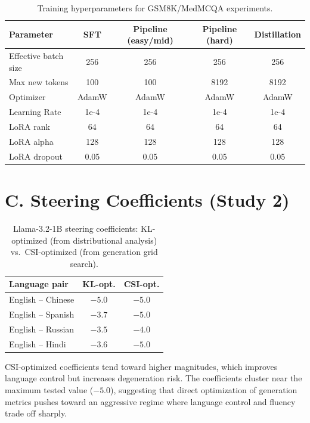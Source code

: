 \begin{table}[h]
\centering
\caption{Training hyperparameters for GSM8K/MedMCQA experiments.}
\begin{tabular}{lcccc}
\toprule
Parameter & SFT & Pipeline (easy/mid) & Pipeline (hard) & Distillation \\
\midrule
Effective batch size & 256 & 256 & 256 & 256 \\
Max new tokens & 100 & 100 & 8192 & 8192 \\
Optimizer & AdamW & AdamW & AdamW & AdamW \\
Learning Rate & 1e-4 & 1e-4 & 1e-4 & 1e-4 \\
LoRA rank & 64 & 64 & 64 & 64 \\
LoRA alpha & 128 & 128 & 128 & 128 \\
LoRA dropout & 0.05 & 0.05 & 0.05 & 0.05 \\
\bottomrule
\end{tabular}
\label{tab:hyperparams_gsm8k}
\end{table}

\section*{C. Steering Coefficients (Study 2)}

\begin{table}[h]
\centering
\caption{Llama-3.2-1B steering coefficients: KL-optimized (from distributional analysis) vs.\ CSI-optimized (from generation grid search).}
\begin{tabular}{lcc}
\toprule
Language pair & KL-opt. & CSI-opt. \\
\midrule
English -- Chinese  & $-5.0$ & $-5.0$ \\
English -- Spanish  & $-3.7$ & $-5.0$ \\
English -- Russian  & $-3.5$ & $-4.0$ \\
English -- Hindi    & $-3.6$ & $-5.0$ \\
\bottomrule
\end{tabular}
\label{tab:appendix_steering_coeff}
\end{table}

CSI-optimized coefficients tend toward higher magnitudes, which improves language control but increases degeneration risk. The coefficients cluster near the maximum tested value ($-5.0$), suggesting that direct optimization of generation metrics pushes toward an aggressive regime where language control and fluency trade off sharply.


